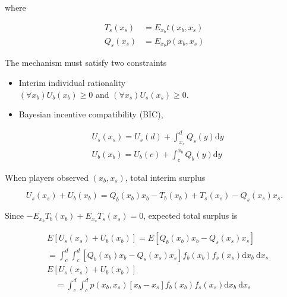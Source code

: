 \documentclass[10pt]{article}
\begin{document}
where

$$
\begin{aligned}
T_{s}\left(x_{s}\right) & =E_{x_{b}} t\left(x_{b}, x_{s}\right) \\
Q_{s}\left(x_{s}\right) & =E_{x_{b}} p\left(x_{b}, x_{s}\right)
\end{aligned}
$$

The mechanism must satisfy two constraints

\begin{itemize}
  \item Interim individual rationality\\
$\left(\forall x_{b}\right) U_{b}\left(x_{b}\right) \geq 0$ and $\left(\forall x_{s}\right) U_{s}\left(x_{s}\right) \geq 0$.
  \item Bayesian incentive compatibility (BIC),
\end{itemize}


\begin{align*}
& U_{s}\left(x_{s}\right)=U_{s}(d)+\int_{x_{s}}^{d} Q_{s}(y) \mathrm{d} y  \tag{1}\\
& U_{b}\left(x_{b}\right)=U_{b}(c)+\int_{c}^{x_{b}} Q_{b}(y) \mathrm{d} y
\end{align*}


When players observed $\left(x_{b}, x_{s}\right)$, total interim surplus

$$
U_{s}\left(x_{s}\right)+U_{b}\left(x_{b}\right)=Q_{b}\left(x_{b}\right) x_{b}-T_{b}\left(x_{b}\right)+T_{s}\left(x_{s}\right)-Q_{s}\left(x_{s}\right) x_{s} .
$$

Since $-E_{x_{b}} T_{b}\left(x_{b}\right)+E_{x_{s}} T_{s}\left(x_{s}\right)=0$, expected total surplus is


\begin{align*}
& E\left[U_{s}\left(x_{s}\right)+U_{b}\left(x_{b}\right)\right]=E\left[Q_{b}\left(x_{b}\right) x_{b}-Q_{s}\left(x_{s}\right) x_{s}\right] \\
& =\int_{c}^{d} \int_{c}^{d}\left[Q_{b}\left(x_{b}\right) x_{b}-Q_{s}\left(x_{s}\right) x_{s}\right] f_{b}\left(x_{b}\right) f_{s}\left(x_{s}\right) \mathrm{d} x_{b} \mathrm{~d} x_{s} \\
& E\left[U_{s}\left(x_{s}\right)+U_{b}\left(x_{b}\right)\right] \\
& \quad=\int_{c}^{d} \int_{c}^{d} p\left(x_{b}, x_{s}\right)\left[x_{b}-x_{s}\right] f_{b}\left(x_{b}\right) f_{s}\left(x_{s}\right) \mathrm{d} x_{b} \mathrm{~d} x_{s} \tag{2}
\end{align*}
\end{document}

